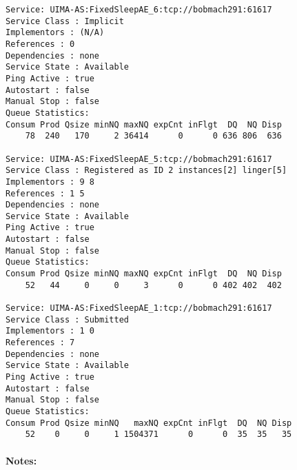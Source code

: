 \begin{description}
\begin{verbatim}
Service: UIMA-AS:FixedSleepAE_6:tcp://bobmach291:61617 
Service Class : Implicit 
Implementors : (N/A) 
References : 0 
Dependencies : none 
Service State : Available 
Ping Active : true 
Autostart : false 
Manual Stop : false 
Queue Statistics: 
Consum Prod Qsize minNQ maxNQ expCnt inFlgt  DQ  NQ Disp 
    78  240   170     2 36414      0      0 636 806  636 

Service: UIMA-AS:FixedSleepAE_5:tcp://bobmach291:61617 
Service Class : Registered as ID 2 instances[2] linger[5] 
Implementors : 9 8 
References : 1 5 
Dependencies : none 
Service State : Available 
Ping Active : true 
Autostart : false 
Manual Stop : false 
Queue Statistics: 
Consum Prod Qsize minNQ maxNQ expCnt inFlgt  DQ  NQ Disp 
    52   44     0     0     3      0      0 402 402  402 

Service: UIMA-AS:FixedSleepAE_1:tcp://bobmach291:61617 
Service Class : Submitted 
Implementors : 1 0 
References : 7 
Dependencies : none 
Service State : Available 
Ping Active : true 
Autostart : false 
Manual Stop : false 
Queue Statistics: 
Consum Prod Qsize minNQ   maxNQ expCnt inFlgt  DQ  NQ Disp 
    52    0     0     1 1504371      0      0  35  35   35 
\end{verbatim}
    \end{description}
    \paragraph{Notes:}

